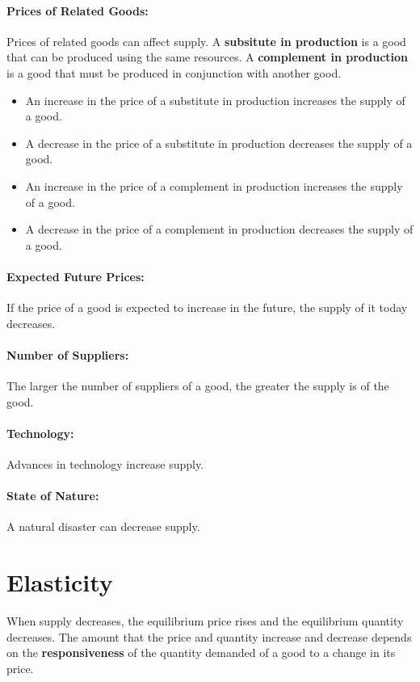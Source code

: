 \documentclass[letterpaper, 12pt]{article}
\begin{document}
\paragraph{Prices of Related Goods:}
Prices of related goods can affect supply. A \textbf{subsitute in production}
is a good that can be produced using the same resources. A \textbf{complement
in production} is a good that must be produced in conjunction with another
good.
\begin{itemize}
  \item An increase in the price of a substitute in production increases the
        supply of a good.
  \item A decrease in the price of a substitute in production decreases the
        supply of a good.
  \item An increase in the price of a complement in production increases the
        supply of a good.
  \item A decrease in the price of a complement in production decreases the
        supply of a good.
\end{itemize}

\paragraph{Expected Future Prices:}
If the price of a good is expected to increase in the future, the supply of it
today decreases.

\paragraph{Number of Suppliers:}
The larger the number of suppliers of a good, the greater the supply is of the
good.

\paragraph{Technology:}
Advances in technology increase supply.

\paragraph{State of Nature:}
A natural disaster can decrease supply.

\section{Elasticity}
When supply decreases, the equilibrium price rises and the equilibrium
quantity decreases. The amount that the price and quantity increase and
decrease depends on the \textbf{responsiveness} of the quantity demanded of
a good to a change in its price.
\end{document}
